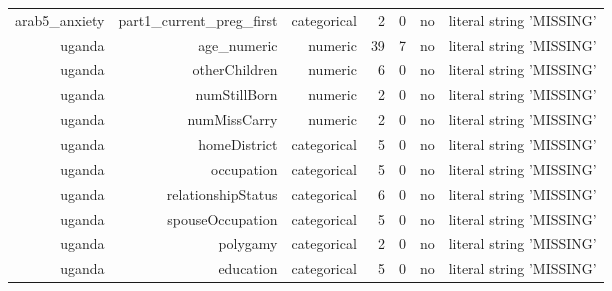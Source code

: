 \documentclass[10pt]{article}
\begin{document}
\begin{longtable}{rrrrrrr}
arab5\_anxiety & part1\_current\_preg\_first & categorical & 2 & 0 & no & literal string 'MISSING' \\
uganda & age\_numeric & numeric & 39 & 7 & no & literal string 'MISSING' \\
uganda & otherChildren & numeric & 6 & 0 & no & literal string 'MISSING' \\
uganda & numStillBorn & numeric & 2 & 0 & no & literal string 'MISSING' \\
uganda & numMissCarry & numeric & 2 & 0 & no & literal string 'MISSING' \\
uganda & homeDistrict & categorical & 5 & 0 & no & literal string 'MISSING' \\
uganda & occupation & categorical & 5 & 0 & no & literal string 'MISSING' \\
uganda & relationshipStatus & categorical & 6 & 0 & no & literal string 'MISSING' \\
uganda & spouseOccupation & categorical & 5 & 0 & no & literal string 'MISSING' \\
uganda & polygamy & categorical & 2 & 0 & no & literal string 'MISSING' \\
uganda & education & categorical & 5 & 0 & no & literal string 'MISSING' \\
\bottomrule
\end{longtable}
\normalsize
\end{document}
